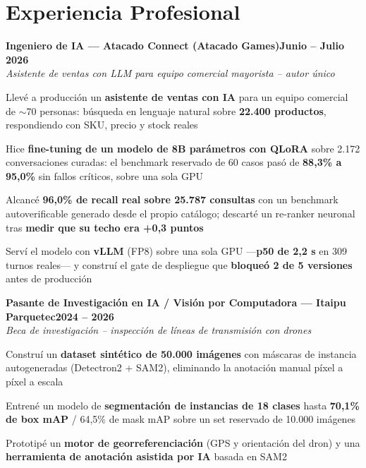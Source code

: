 \documentclass[letterpaper,10pt]{article}
\newcommand{\heading}[2]{
  \hspace{10pt}#1\hfill#2\\
}
\newcommand{\headingBf}[2]{
  \heading{\textbf{#1}}{\textbf{#2}}
}
\newcommand{\headingIt}[2]{
  \heading{\textit{#1}}{\textit{#2}}
}
\newenvironment{resume_list}{
  \vspace{-7pt}
  \begin{itemize}[itemsep=-2px, parsep=1pt, leftmargin=30pt]
}{
  \end{itemize}
}
\begin{document}

  \section{Experiencia Profesional}

  \headingBf{Ingeniero de IA — Atacado Connect (Atacado Games)}{Junio -- Julio 2026}
  \headingIt{Asistente de ventas con LLM para equipo comercial mayorista -- autor único}{}
  \begin{resume_list}
    \item Llevé a producción un \textbf{asistente de ventas con IA} para un equipo comercial de $\sim$70 personas: búsqueda en lenguaje natural sobre \textbf{22.400 productos}, respondiendo con SKU, precio y stock reales
    \item Hice \textbf{fine-tuning de un modelo de 8B parámetros con QLoRA} sobre 2.172 conversaciones curadas: el benchmark reservado de 60 casos pasó de \textbf{88,3\% a 95,0\%} sin fallos críticos, sobre una sola GPU
    \item Alcancé \textbf{96,0\% de recall real sobre 25.787 consultas} con un benchmark autoverificable generado desde el propio catálogo; descarté un re-ranker neuronal tras \textbf{medir que su techo era +0,3 puntos}
    \item Serví el modelo con \textbf{vLLM} (FP8) sobre una sola GPU —\textbf{p50 de 2,2 s} en 309 turnos reales— y construí el gate de despliegue que \textbf{bloqueó 2 de 5 versiones} antes de producción
  \end{resume_list}

  \headingBf{Pasante de Investigación en IA / Visión por Computadora — Itaipu Parquetec}{2024 -- 2026}
  \headingIt{Beca de investigación -- inspección de líneas de transmisión con drones}{}
  \begin{resume_list}
    \item Construí un \textbf{dataset sintético de 50.000 imágenes} con máscaras de instancia autogeneradas (Detectron2 + SAM2), eliminando la anotación manual píxel a píxel a escala
    \item Entrené un modelo de \textbf{segmentación de instancias de 18 clases} hasta \textbf{70,1\% de box mAP} / 64,5\% de mask mAP sobre un set reservado de 10.000 imágenes
    \item Prototipé un \textbf{motor de georreferenciación} (GPS y orientación del dron) y una \textbf{herramienta de anotación asistida por IA} basada en SAM2
  \end{resume_list}
\end{document}
